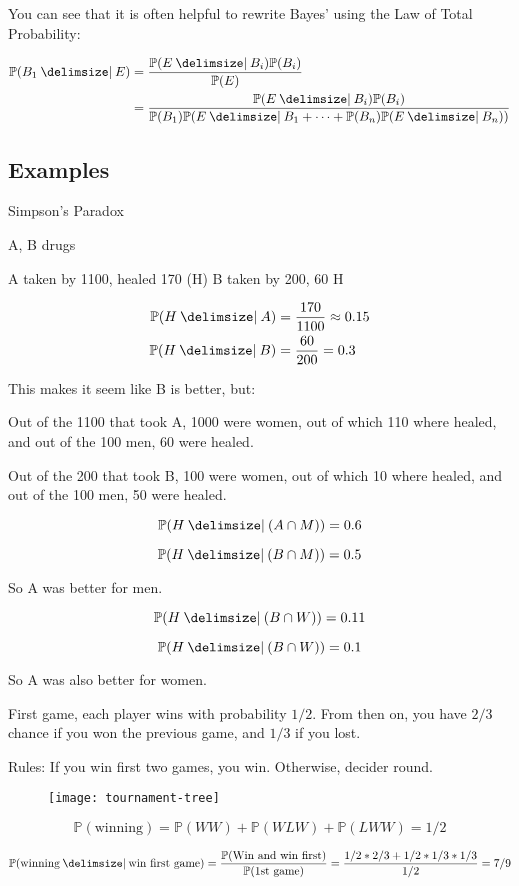 \documentclass[main.tex]{subfiles}
\begin{document}
You can see that it is often helpful to rewrite Bayes' using the Law of Total Probability:

\begin{align}
\mathbb{P}(B_1 \given E) &= \frac{\mathbb{P}(E \given B_i)\mathbb{P}(B_i)}{\mathbb{P}(E)} \\
                         &= \frac{\mathbb{P}(E \given B_i)\mathbb{P}(B_i)}{\mathbb{P}(B_1)\mathbb{P}(E\given B_1 + \cdots + \mathbb{P}(B_n)\mathbb{P}(E \given B_n))}
\end{align}

\subsection{Examples}

\begin{exmp}
Simpson's Paradox

A, B drugs

A taken by 1100, healed 170 (H)
B taken by 200, 60 H

\begin{align}
\mathbb{P}(H\given A) &= \frac{170}{1100} \approx 0.15 \\
\mathbb{P}(H\given B) &= \frac{60}{200} = 0.3
\end{align}

This makes it seem like B is better, but:

Out of the 1100 that took A, 1000 were women, out of which 110 where healed, and out of the 100 men, 60 were healed.

Out of the 200 that took B, 100 were women, out of which 10 where healed, and out of the 100 men, 50 were healed.

$$\mathbb{P}(H \given (A\cap M)) = 0.6$$

$$\mathbb{P}(H \given (B \cap M)) = 0.5$$

So A was better for men.

$$\mathbb{P}(H \given (B\cap W)) = 0.11$$

$$\mathbb{P}(H \given (B \cap W)) = 0.1$$

So A was also better for women.
\end{exmp}

\begin{exmp}
    First game, each player wins with probability $1/2$. From then on, you have $2/3$ chance if you won the previous game, and $1/3$ if you lost.

    Rules: If you win first two games, you win. Otherwise, decider round.

    \begin{figure}[H]
        \centering
        \texttt{[image: tournament-tree]}
    \end{figure}

    $$\mathbb{P}(\textrm{winning}) = \mathbb{P}(WW) + \mathbb{P}(WLW) + \mathbb{P}(LWW) = 1/2$$

    $$\mathbb{P}(\textrm{winning}\given\textrm{win first game}) = \frac{\mathbb{P}(\textrm{Win and win first})}{\mathbb{P}(\textrm{1st game})} = \frac{1/2*2/3 + 1/2 * 1/3 * 1/3}{1/2} = 7/9$$

\end{exmp}
\end{document}
